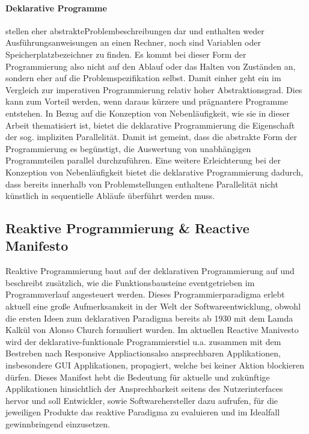 \documentclass[12pt,oneside,a4paper,bibtotoc,liststotoc]{scrreprt}
\begin{document}
\paragraph{Deklarative Programme} stellen eher \glqq abstrakte\grqq Problembeschreibungen dar und enthalten weder Ausführungsanweisungen an einen Rechner, noch sind Variablen oder Speicherplatzbezeichner zu finden. Es kommt bei dieser Form der Programmierung also nicht auf den Ablauf oder das Halten von Zuständen an, sondern eher auf die Problemspezifikation selbst. Damit einher geht ein im Vergleich zur imperativen Programmierung relativ hoher Abstraktionsgrad. Dies kann zum Vorteil werden, wenn daraus kürzere und prägnantere Programme entstehen. In Bezug auf die Konzeption von Nebenläufigkeit, wie sie in dieser Arbeit thematisiert ist, bietet die deklarative Programmierung die Eigenschaft der sog. impliziten Parallelität. Damit ist gemeint, dass die abstrakte Form der Programmierung es begünstigt, die Auswertung von unabhängigen Programmteilen parallel durchzuführen. Eine weitere Erleichterung bei der Konzeption von Nebenläufigkeit bietet die deklarative Programmierung dadurch, dass bereits innerhalb von Problemstellungen enthaltene Parallelität nicht künstlich in sequentielle Abläufe überführt werden muss.

\subsection{Reaktive Programmierung \& Reactive Manifesto}
Reaktive Programmierung baut auf der deklarativen Programmierung auf und beschreibt zusätzlich, wie die Funktionsbausteine eventgetrieben im Programmverlauf angesteuert werden. Dieses Programmierparadigma erlebt aktuell eine große Aufmerksamkeit in der Welt der Softwareentwicklung, obwohl die ersten Ideen zum deklarativen Paradigma bereits ab 1930 mit dem Lamda Kalkül von Alonso Church formuliert wurden. Im aktuellen Reactive Manivesto wird der deklarative-funktionale Programmierstiel u.a. zusammen mit dem Bestreben nach \glqq Responsive Appliactions\grqq also ansprechbaren Applikationen, insbesondere GUI Applikationen, propagiert, welche bei keiner Aktion blockieren dürfen. Dieses Manifest hebt die Bedeutung für aktuelle und zukünftige Applikationen hinsichtlich der Ansprechbarkeit seitens des Nutzerinterfaces hervor und soll Entwickler, sowie Softwarehersteller dazu aufrufen, für die jeweiligen Produkte das reaktive Paradigma zu evaluieren und im Idealfall gewinnbringend einzusetzen.
\end{document}
